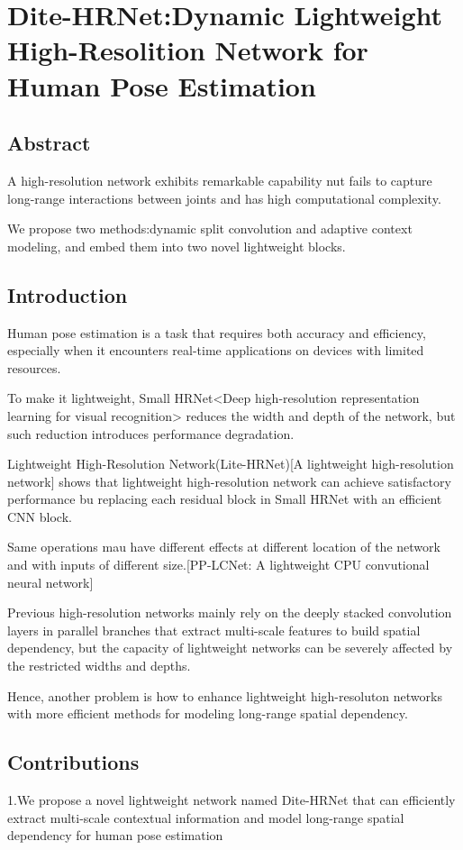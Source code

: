 \documentclass[11pt]{article}
\begin{document}
\section{Dite-HRNet:Dynamic Lightweight High-Resolition Network for Human Pose Estimation}
\subsection{Abstract}
A high-resolution network exhibits remarkable capability nut fails to capture long-range interactions between joints and has high computational complexity.

We propose two methods:dynamic split convolution and adaptive context modeling, and embed them into two novel lightweight blocks.
\subsection{Introduction}
Human pose estimation is a task that requires both accuracy and efficiency, especially when it encounters real-time applications on devices with limited resources.

To make it lightweight, Small HRNet<Deep high-resolution representation learning for visual recognition> reduces the width and depth of the network, but such reduction introduces performance degradation.

Lightweight High-Resolution Network(Lite-HRNet)[A lightweight high-resolution network] shows that lightweight high-resolution network can achieve satisfactory performance bu replacing each residual block in Small HRNet with an efficient CNN block.

Same operations mau have different effects at different location of the network and with inputs of different size.[PP-LCNet: A lightweight CPU convutional neural network]

Previous high-resolution networks mainly rely on the deeply stacked convolution layers in parallel branches that extract multi-scale features to build spatial dependency, but the capacity of lightweight networks can be severely affected by the restricted widths and depths.

Hence, another problem is how to enhance lightweight high-resoluton networks with more efficient methods for modeling long-range spatial dependency.

\subsection{Contributions}
1.We propose a novel lightweight network named Dite-HRNet that can efficiently extract multi-scale contextual information and model long-range spatial dependency for human pose estimation
\end{document}

